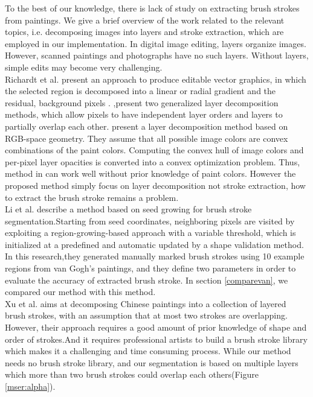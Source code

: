 To the best of our knowledge, there is lack of study on extracting brush strokes from paintings. We give a brief overview of the work related to the relevant topics, i.e. decomposing images into layers and stroke extraction, which are employed in our implementation. In digital image editing, layers organize images. However, scanned paintings and photographs have no such layers. Without layers, simple edits may become very challenging.\\
Richardt et al.\cite{richardt2014vectorising} present an approach to produce editable vector graphics, in which the selected region is decomposed into a linear or radial gradient and the residual, background pixels . \cite{mccann2009local},\cite{mccann2012soft}present two generalized layer decomposition methods, which allow pixels to have independent layer orders and layers to partially overlap each other.\cite{tan2016decomposing} present a layer decomposition method based on RGB-space geometry. They assume that all possible image colors are convex combinations of the paint colors. Computing the convex hull of image colors and per-pixel layer opacities is converted into a convex optimization problem. Thus, method in \cite{tan2016decomposing} can work well without prior knowledge of paint colors. However the proposed method simply focus on layer decomposition not stroke extraction, how to extract the brush stroke remains a problem.\\ 
Li et al.\cite{li2012rhythmic} describe a method based on seed growing for brush stroke segmentation.Starting from seed coordinates, neighboring pixels are visited by exploiting a region-growing-based approach with a variable threshold, which is initialized at a predefined and automatic updated by a shape validation method. In this research,they generated manually marked brush strokes using 10 example regions from van Gogh's paintings, and they define two parameters in order to evaluate the accuracy of extracted brush stroke. In section \ref{comparevan}, we compared our method with this method.  \\
Xu et al.\cite{xu2006animating} aims at decomposing Chinese paintings into a collection of layered brush strokes, with an assumption that at most two strokes are overlapping. However, their approach requires a good amount of prior knowledge of shape and order of strokes.And it requires professional artists to build a brush stroke library which makes it a challenging and time consuming process. While our method needs no brush stroke library, and our segmentation is based on multiple layers which more than two brush strokes could overlap each others(Figure \ref{mser:alpha}). \\ \\
